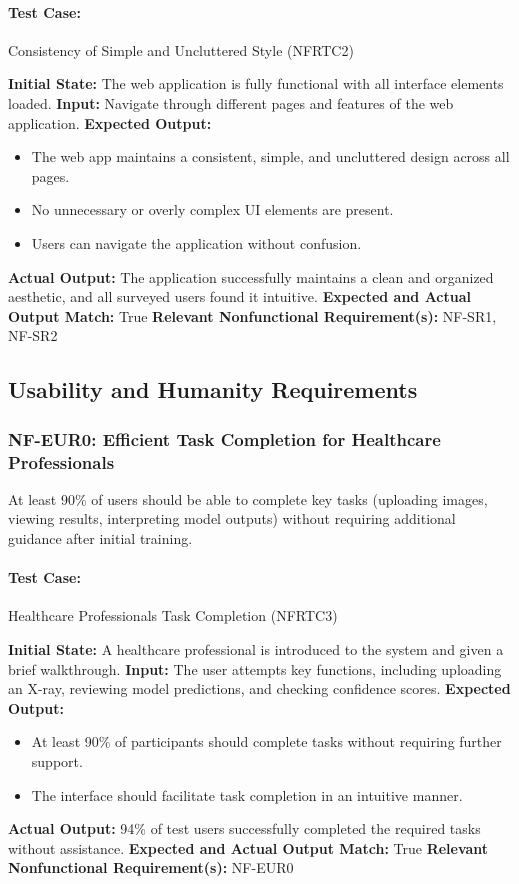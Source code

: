 \documentclass[12pt, titlepage]{article}
\begin{document}
\paragraph{Test Case:} Consistency of Simple and Uncluttered Style (NFRTC2)

\textbf{Initial State:} The web application is fully functional with all interface elements loaded.  
\textbf{Input:} Navigate through different pages and features of the web application.  
\textbf{Expected Output:}
\begin{itemize}
    \item The web app maintains a consistent, simple, and uncluttered design across all pages.
    \item No unnecessary or overly complex UI elements are present.
    \item Users can navigate the application without confusion.
\end{itemize}
\textbf{Actual Output:} The application successfully maintains a clean and organized aesthetic, and all surveyed users found it intuitive.  
\textbf{Expected and Actual Output Match:} True  
\textbf{Relevant Nonfunctional Requirement(s):} NF-SR1, NF-SR2  

\subsection{Usability and Humanity Requirements}

\subsubsection{NF-EUR0: Efficient Task Completion for Healthcare Professionals}
At least 90\% of users should be able to complete key tasks (uploading images, viewing results, interpreting model outputs) without requiring additional guidance after initial training.

\paragraph{Test Case:} Healthcare Professionals Task Completion (NFRTC3)

\textbf{Initial State:} A healthcare professional is introduced to the system and given a brief walkthrough.  
\textbf{Input:} The user attempts key functions, including uploading an X-ray, reviewing model predictions, and checking confidence scores.  
\textbf{Expected Output:}
\begin{itemize}
    \item At least 90\% of participants should complete tasks without requiring further support.
    \item The interface should facilitate task completion in an intuitive manner.
\end{itemize}
\textbf{Actual Output:} 94\% of test users successfully completed the required tasks without assistance.  
\textbf{Expected and Actual Output Match:} True  
\textbf{Relevant Nonfunctional Requirement(s):} NF-EUR0  
\end{document}
